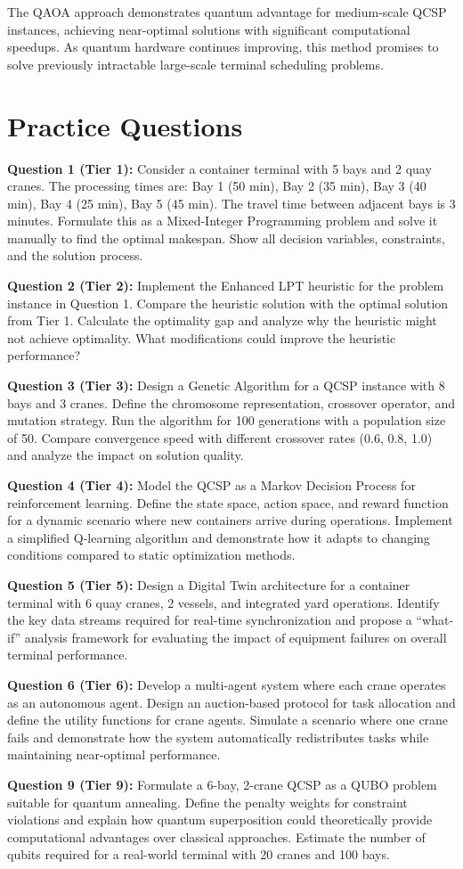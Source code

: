 \documentclass{article}
\begin{document}
The QAOA approach demonstrates quantum advantage for medium-scale QCSP instances, achieving near-optimal solutions with significant computational speedups. As quantum hardware continues improving, this method promises to solve previously intractable large-scale terminal scheduling problems.

\section{Practice Questions}

\textbf{Question 1 (Tier 1):} Consider a container terminal with 5 bays and 2 quay cranes. The processing times are: Bay 1 (50 min), Bay 2 (35 min), Bay 3 (40 min), Bay 4 (25 min), Bay 5 (45 min). The travel time between adjacent bays is 3 minutes. Formulate this as a Mixed-Integer Programming problem and solve it manually to find the optimal makespan. Show all decision variables, constraints, and the solution process.

\textbf{Question 2 (Tier 2):} Implement the Enhanced LPT heuristic for the problem instance in Question 1. Compare the heuristic solution with the optimal solution from Tier 1. Calculate the optimality gap and analyze why the heuristic might not achieve optimality. What modifications could improve the heuristic performance?

\textbf{Question 3 (Tier 3):} Design a Genetic Algorithm for a QCSP instance with 8 bays and 3 cranes. Define the chromosome representation, crossover operator, and mutation strategy. Run the algorithm for 100 generations with a population size of 50. Compare convergence speed with different crossover rates (0.6, 0.8, 1.0) and analyze the impact on solution quality.

\textbf{Question 4 (Tier 4):} Model the QCSP as a Markov Decision Process for reinforcement learning. Define the state space, action space, and reward function for a dynamic scenario where new containers arrive during operations. Implement a simplified Q-learning algorithm and demonstrate how it adapts to changing conditions compared to static optimization methods.

\textbf{Question 5 (Tier 5):} Design a Digital Twin architecture for a container terminal with 6 quay cranes, 2 vessels, and integrated yard operations. Identify the key data streams required for real-time synchronization and propose a ``what-if'' analysis framework for evaluating the impact of equipment failures on overall terminal performance.

\textbf{Question 6 (Tier 6):} Develop a multi-agent system where each crane operates as an autonomous agent. Design an auction-based protocol for task allocation and define the utility functions for crane agents. Simulate a scenario where one crane fails and demonstrate how the system automatically redistributes tasks while maintaining near-optimal performance.

\textbf{Question 9 (Tier 9):} Formulate a 6-bay, 2-crane QCSP as a QUBO problem suitable for quantum annealing. Define the penalty weights for constraint violations and explain how quantum superposition could theoretically provide computational advantages over classical approaches. Estimate the number of qubits required for a real-world terminal with 20 cranes and 100 bays.
\end{document}
